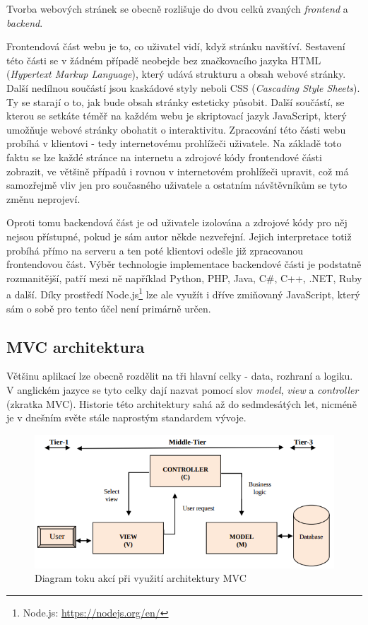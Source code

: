 Tvorba webových stránek se obecně rozlišuje do dvou celků zvaných \emph{frontend} a \emph{backend}.

Frontendová část webu je to, co uživatel vidí, když stránku navštíví. Sestavení této části se v žádném případě neobejde bez značkovacího jazyka HTML (\emph{Hypertext Markup Language}), který udává strukturu a obsah webové stránky. Další nedílnou součástí jsou kaskádové styly neboli CSS (\emph{Cascading Style Sheets}). Ty se starají o to, jak bude obsah stránky esteticky působit. Další součástí, se kterou se setkáte téměř na každém webu je skriptovací jazyk JavaScript, který umožňuje webové stránky obohatit o interaktivitu.
Zpracování této části webu probíhá v klientovi - tedy internetovému prohlížeči uživatele. Na základě toto faktu se lze každé stránce na internetu  a zdrojové kódy frontendové části zobrazit, ve většině případů i rovnou v internetovém prohlížeči upravit, což má samozřejmě vliv jen pro současného uživatele a ostatním návštěvníkům se tyto změnu neprojeví.

Oproti tomu backendová část je od uživatele izolována a zdrojové kódy pro něj nejsou přístupné, pokud je sám autor někde nezveřejní. Jejich interpretace totiž probíhá přímo na serveru a ten poté klientovi odešle již zpracovanou frontendovou část. Výběr technologie implementace backendové části je podstatně rozmanitější, patří mezi ně například Python, PHP, Java, C#, C++, .NET, Ruby a další. Díky prostředí Node.js\footnote{Node.js: \url{https://nodejs.org/en/}} lze ale využít i dříve zmiňovaný JavaScript, který sám o sobě pro tento účel není primárně určen. 

\subsection{MVC architektura}
Většinu aplikací lze obecně rozdělit na tři hlavní celky - data, rozhraní a logiku. V anglickém jazyce se tyto celky dají nazvat pomocí slov \emph{model}, \emph{view} a \emph{controller} (zkratka MVC). Historie této architektury sahá až do sedmdesátých let, nicméně je v dnešním světe stále naprostým standardem vývoje.

\begin{figure}[H]
	\centering
	\includegraphics[width=\textwidth]{images/mvc.png}
	\caption{Diagram toku akcí při využití architektury MVC}
	\label{mvc}
\end{figure}

